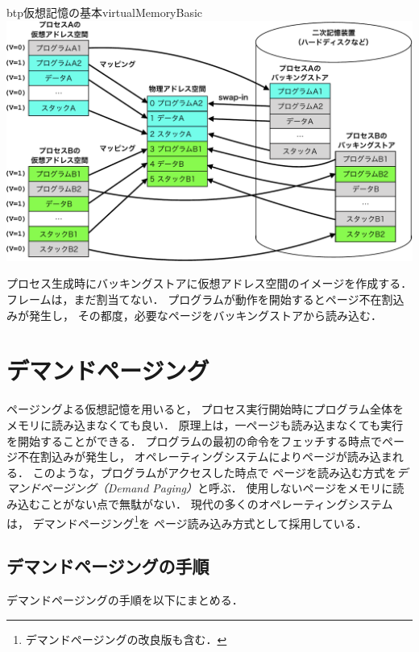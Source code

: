 \begin{myfig}{btp}{仮想記憶の基本}{virtualMemoryBasic}
  \includegraphics[scale=0.66]{Fig/virtualMemoryBasic-crop.pdf}
\end{myfig}

プロセス生成時にバッキングストアに仮想アドレス空間のイメージを作成する．
フレームは，まだ割当てない．
プログラムが動作を開始するとページ不在割込みが発生し，
その都度，必要なページをバッキングストアから読み込む．

\section{デマンドページング}\label{demandPaging}
ページングよる仮想記憶を用いると，
プロセス実行開始時にプログラム全体をメモリに読み込まなくても良い．
原理上は，一ページも読み込まなくても実行を開始することができる．
プログラムの最初の命令をフェッチする時点でページ不在割込みが発生し，
オペレーティングシステムによりページが読み込まれる．
このような，プログラムがアクセスした時点で
ページを読み込む方式を\emph{デマンドページング（Demand Paging）}と呼ぶ．
使用しないページをメモリに読み込むことがない点で無駄がない．
現代の多くのオペレーティングシステムは，
デマンドページング\footnote{デマンドページングの改良版も含む．}を
ページ読み込み方式として採用している．

\subsection{デマンドページングの手順}
デマンドページングの手順を以下にまとめる．

